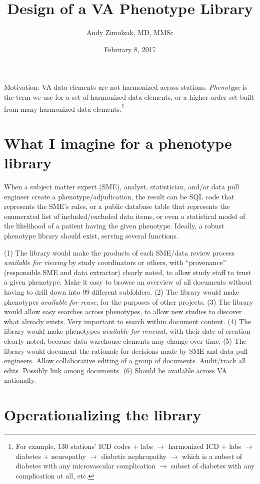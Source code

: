 \documentclass{tufte-handout}
\title{Design of a VA Phenotype Library}
\author{Andy Zimolzak, MD, MMSc}
\date{February 8, 2017}
\begin{document}
\maketitle

Motivation: VA data elements are not harmonized across stations.
\emph{Phenotype} is the term we use for a set of harmonized data
elements, or a higher order set built from many harmonized data
elements.\footnote{For example, 130 stations' ICD codes + labs $\to$
  harmonized ICD + labs $\to$ diabetes + neuropathy $\to$ diabetic
  nephropathy $\to$ which is a subset of diabetes with any
  microvascular complication $\to$ subset of diabetes with any
  complication at all, etc.}

\section{What I imagine for a phenotype library}

When a subject matter expert (SME), analyst, statistician, and/or data
pull engineer create a phenotype/adjudication, the result can be SQL
code that represents the SME's rules, or a public database table that
represents the enumerated list of included/excluded data items, or
even a statistical model of the likelihood of a patient having the
given phenotype. Ideally, a robust phenotype library should exist,
serving several functions.

(1) The library would make the products of each SME/data review
process \emph{available for viewing} by study coordinators or others,
with ``provenance'' (responsible SME and data extractor) clearly
noted, to allow study staff to trust a given phenotype. Make it easy
to browse an overview of all documents without having to drill down
into 99 different subfolders. (2) The library would make phenotypes
\emph{available for reuse}, for the purposes of other projects. (3)
The library would allow easy searches across phenotypes, to allow new
studies to discover what already exists. Very important to search
within document content. (4) The library would make phenotypes
\emph{available for renewal,} with their date of creation clearly
noted, because data warehouse elements may change over time. (5) The
library would document the rationale for decisions made by SME and
data pull engineers. Allow collaborative editing of a group of
documents. Audit/track all edits. Possibly link among documents. (6)
Should be available across VA nationally.

\section{Operationalizing the library}
\end{document}
